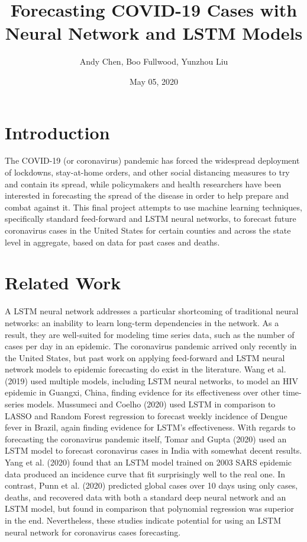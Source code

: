 ﻿\documentclass{article}
\title{Forecasting COVID-19 Cases with Neural Network and LSTM Models}
\author{Andy Chen, Boo Fullwood, Yunzhou Liu}
\date{May 05, 2020}
\begin{document}
\maketitle

\begin{multicols}{2}
  
\section*{Introduction}

The COVID-19 (or coronavirus) pandemic has forced the widespread deployment of
lockdowns, stay-at-home orders, and other social distancing measures to try and
contain its spread, while policymakers and health researchers have been
interested in forecasting the spread of the disease in order to help prepare and
combat against it. This final project attempts to use machine learning
techniques, specifically standard feed-forward and LSTM neural networks, to
forecast future coronavirus cases in the United States for certain counties and
across the state level in aggregate, based on data for past cases and deaths.


\section*{Related Work}


A LSTM neural network addresses a particular shortcoming of traditional neural
networks: an inability to learn long-term dependencies in the network. As a
result, they are well-suited for modeling time series data, such as the number
of cases per day in an epidemic. The coronavirus pandemic arrived only recently
in the United States, but past work on applying feed-forward and LSTM neural
network models to epidemic forecasting do exist in the literature. Wang et al.
(2019) used multiple models, including LSTM neural networks, to model an HIV
epidemic in Guangxi, China, finding evidence for its effectiveness over other
time-series models. Mussumeci and Coelho (2020) used LSTM in comparison to LASSO
and Random Forest regression to forecast weekly incidence of Dengue fever in
Brazil, again finding evidence for LSTM’s effectiveness. With regards to
forecasting the coronavirus pandemic itself, Tomar and Gupta (2020) used an LSTM
model to forecast coronavirus cases in India with somewhat decent results. Yang
et al. (2020) found that an LSTM model trained on 2003 SARS epidemic data
produced an incidence curve that fit surprisingly well to the real one. In
contrast, Punn et al. (2020) predicted global cases over 10 days using only
cases, deaths, and recovered data with both a standard deep neural network and
an LSTM model, but found in comparison that polynomial regression was superior
in the end. Nevertheless, these studies indicate potential for using an LSTM
neural network for coronavirus cases forecasting.\\


\end{multicols}
\end{document}
